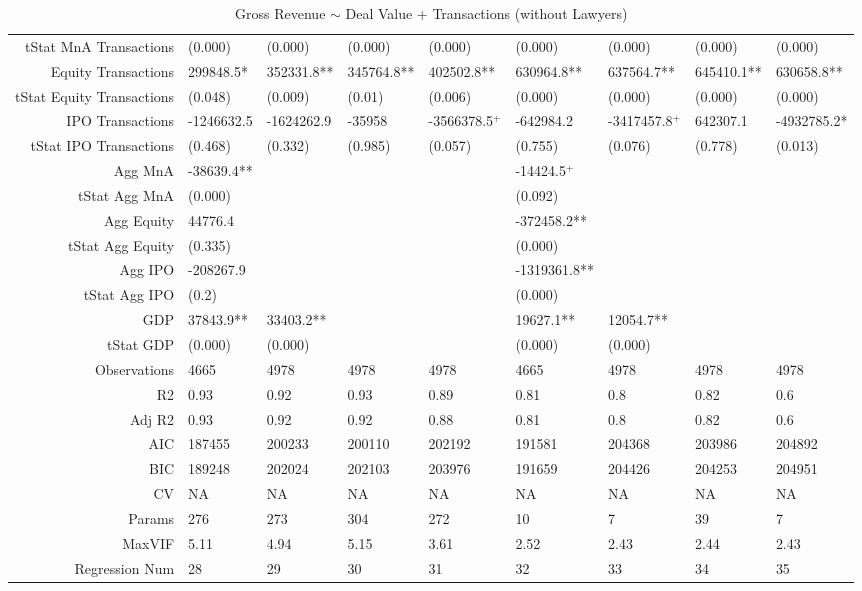 \begin{table}[ht]
\begin{tabular}{rllllllll}
  tStat MnA Transactions & (0.000) & (0.000) & (0.000) & (0.000) & (0.000) & (0.000) & (0.000) & (0.000) \\ 
  Equity Transactions & 299848.5* & 352331.8** & 345764.8** & 402502.8** & 630964.8** & 637564.7** & 645410.1** & 630658.8** \\ 
  tStat Equity Transactions & (0.048) & (0.009) & (0.01) & (0.006) & (0.000) & (0.000) & (0.000) & (0.000) \\ 
  IPO Transactions & -1246632.5 & -1624262.9 & -35958 & -3566378.5$^{+}$ & -642984.2 & -3417457.8$^{+}$ & 642307.1 & -4932785.2* \\ 
  tStat IPO Transactions & (0.468) & (0.332) & (0.985) & (0.057) & (0.755) & (0.076) & (0.778) & (0.013) \\ 
  Agg MnA & -38639.4** &  &  &  & -14424.5$^{+}$ &  &  &  \\ 
  tStat Agg MnA & (0.000) &  &  &  & (0.092) &  &  &  \\ 
  Agg Equity & 44776.4 &  &  &  & -372458.2** &  &  &  \\ 
  tStat Agg Equity & (0.335) &  &  &  & (0.000) &  &  &  \\ 
  Agg IPO & -208267.9 &  &  &  & -1319361.8** &  &  &  \\ 
  tStat Agg IPO & (0.2) &  &  &  & (0.000) &  &  &  \\ 
  GDP & 37843.9** & 33403.2** &  &  & 19627.1** & 12054.7** &  &  \\ 
  tStat GDP & (0.000) & (0.000) &  &  & (0.000) & (0.000) &  &  \\ 
  Observations & 4665 & 4978 & 4978 & 4978 & 4665 & 4978 & 4978 & 4978 \\ 
  R2 & 0.93 & 0.92 & 0.93 & 0.89 & 0.81 & 0.8 & 0.82 & 0.6 \\ 
  Adj R2 & 0.93 & 0.92 & 0.92 & 0.88 & 0.81 & 0.8 & 0.82 & 0.6 \\ 
  AIC & 187455 & 200233 & 200110 & 202192 & 191581 & 204368 & 203986 & 204892 \\ 
  BIC & 189248 & 202024 & 202103 & 203976 & 191659 & 204426 & 204253 & 204951 \\ 
  CV & NA & NA & NA & NA & NA & NA & NA & NA \\ 
  Params & 276 & 273 & 304 & 272 & 10 & 7 & 39 & 7 \\ 
  MaxVIF & 5.11 & 4.94 & 5.15 & 3.61 & 2.52 & 2.43 & 2.44 & 2.43 \\ 
  Regression Num & 28 & 29 & 30 & 31 & 32 & 33 & 34 & 35 \\ 
   \hline
\end{tabular}
\caption{Gross Revenue $\sim$ Deal Value + Transactions (without Lawyers)} 
\end{table}
